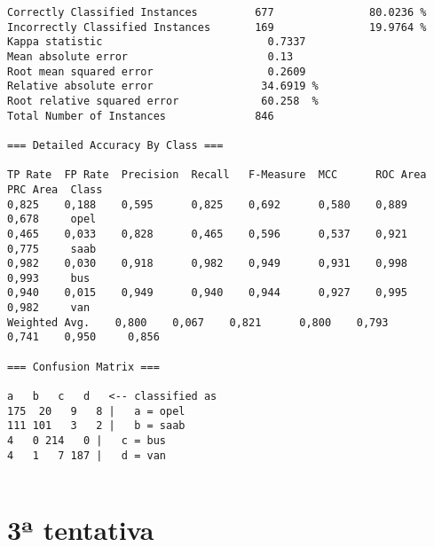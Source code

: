 \documentclass[
	article,			%
	11pt,				%
	oneside,			%
	a4paper,			%
	english,			%
	brazil,				%
	sumario=tradicional
	]{abntex2}
\begin{document}
\begin{lstlisting}
Correctly Classified Instances         677               80.0236 %
Incorrectly Classified Instances       169               19.9764 %
Kappa statistic                          0.7337
Mean absolute error                      0.13  
Root mean squared error                  0.2609
Relative absolute error                 34.6919 %
Root relative squared error             60.258  %
Total Number of Instances              846     

=== Detailed Accuracy By Class ===

TP Rate  FP Rate  Precision  Recall   F-Measure  MCC      ROC Area  PRC Area  Class
0,825    0,188    0,595      0,825    0,692      0,580    0,889     0,678     opel
0,465    0,033    0,828      0,465    0,596      0,537    0,921     0,775     saab
0,982    0,030    0,918      0,982    0,949      0,931    0,998     0,993     bus
0,940    0,015    0,949      0,940    0,944      0,927    0,995     0,982     van
Weighted Avg.    0,800    0,067    0,821      0,800    0,793      0,741    0,950     0,856     

=== Confusion Matrix ===

a   b   c   d   <-- classified as
175  20   9   8 |   a = opel
111 101   3   2 |   b = saab
4   0 214   0 |   c = bus
4   1   7 187 |   d = van


\end{lstlisting}

\newpage

\section{3ª tentativa}
\end{document}
